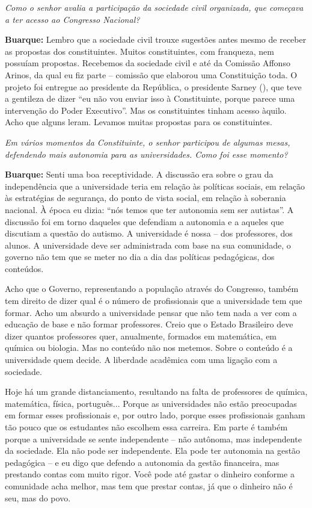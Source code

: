 \emph{Como o senhor avalia a participação da sociedade civil organizada, que
começava a ter acesso ao Congresso Nacional?}

\textbf{Buarque:} Lembro que a sociedade civil trouxe sugestões antes
mesmo de receber as propostas dos constituintes. Muitos constituintes,
com franqueza, nem possuíam propostas. Recebemos da sociedade civil e
até da Comissão Affonso Arinos, da qual eu fiz parte -- comissão que
elaborou uma Constituição toda. O projeto foi entregue ao presidente da
República, o presidente Sarney (), que teve a gentileza de dizer
``eu não vou enviar isso à Constituinte, porque parece uma intervenção
do Poder Executivo''. Mas os constituintes tinham acesso àquilo. Acho
que alguns leram. Levamos muitas propostas para os constituintes.

\emph{Em vários momentos da Constituinte, o senhor participou de
algumas mesas, defendendo mais autonomia para as universidades. Como foi
esse momento?}

\textbf{Buarque:} Senti uma boa receptividade. A discussão era sobre o
grau da independência que a universidade teria em relação às políticas
sociais, em relação às estratégias de segurança, do ponto de vista
social, em relação à soberania nacional. À época eu dizia: ``nós temos
que ter autonomia sem ser autistas''. A discussão foi em torno daqueles
que defendiam a autonomia e a aqueles que discutiam a questão do
autismo. A universidade é nossa -- dos professores, dos alunos. A
universidade deve ser administrada com base na sua comunidade, o governo
não tem que se meter no dia a dia das políticas pedagógicas, dos
conteúdos.

Acho que o Governo, representando a população através do Congresso,
também tem direito de dizer qual é o número de profissionais que a
universidade tem que formar. Acho um absurdo a universidade pensar que
não tem nada a ver com a educação de base e não formar professores.
Creio que o Estado Brasileiro deve dizer quantos professores quer,
anualmente, formados em matemática, em química ou biologia. Mas no
conteúdo não nos metemos. Sobre o conteúdo é a universidade quem decide.
A liberdade acadêmica com uma ligação com a sociedade.

Hoje há um grande distanciamento, resultando na falta de professores de
química, matemática, física, português... Porque as universidades não
estão preocupadas em formar esses profissionais e, por outro lado,
porque esses profissionais ganham tão pouco que os estudantes não
escolhem essa carreira. Em parte é também porque a universidade se sente
independente -- não autônoma, mas independente da sociedade. Ela não
pode ser independente. Ela pode ter autonomia na gestão pedagógica -- e
eu digo que defendo a autonomia da gestão financeira, mas prestando
contas com muito rigor. Você pode até gastar o dinheiro conforme a
comunidade acha melhor, mas tem que prestar contas, já que o dinheiro
não é seu, mas do povo.

